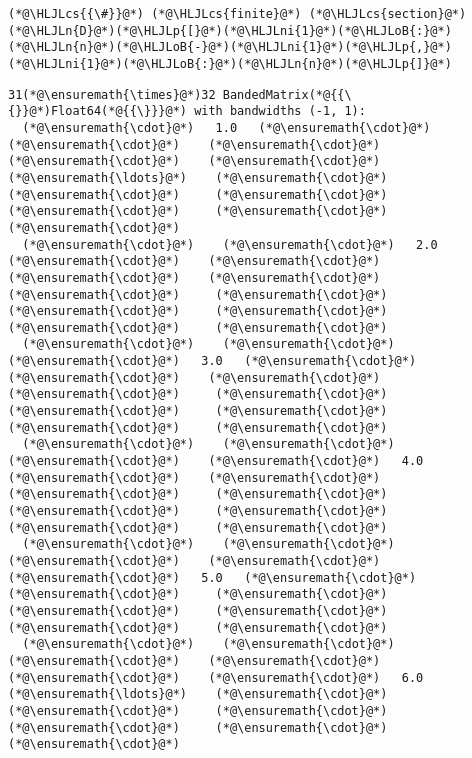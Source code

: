 \documentclass[12pt,a4paper]{article}
\newcommand{\HLJLn}[1]{#1}
\newcommand{\HLJLni}[1]{\textcolor[RGB]{59,151,46}{#1}}
\newcommand{\HLJLoB}[1]{\textcolor[RGB]{102,102,102}{\textbf{#1}}}
\newcommand{\HLJLp}[1]{#1}
\newcommand{\HLJLcs}[1]{\textcolor[RGB]{153,153,119}{\textit{#1}}}
\begin{document}
\begin{lstlisting}
(*@\HLJLcs{{\#}}@*) (*@\HLJLcs{finite}@*) (*@\HLJLcs{section}@*)
(*@\HLJLn{D}@*)(*@\HLJLp{[}@*)(*@\HLJLni{1}@*)(*@\HLJLoB{:}@*)(*@\HLJLn{n}@*)(*@\HLJLoB{-}@*)(*@\HLJLni{1}@*)(*@\HLJLp{,}@*)(*@\HLJLni{1}@*)(*@\HLJLoB{:}@*)(*@\HLJLn{n}@*)(*@\HLJLp{]}@*)
\end{lstlisting}

\begin{lstlisting}
31(*@\ensuremath{\times}@*)32 BandedMatrix(*@{{\{}}@*)Float64(*@{{\}}}@*) with bandwidths (-1, 1):
  (*@\ensuremath{\cdot}@*)   1.0   (*@\ensuremath{\cdot}@*)    (*@\ensuremath{\cdot}@*)    (*@\ensuremath{\cdot}@*)    (*@\ensuremath{\cdot}@*)    (*@\ensuremath{\cdot}@*)   (*@\ensuremath{\ldots}@*)    (*@\ensuremath{\cdot}@*)     (*@\ensuremath{\cdot}@*)     (*@\ensuremath{\cdot}@*)     (*@\ensuremath{\cdot}@*)     (*@\ensuremath{\cdot}@*)     (*@\ensuremath{\cdot}@*) 
  (*@\ensuremath{\cdot}@*)    (*@\ensuremath{\cdot}@*)   2.0   (*@\ensuremath{\cdot}@*)    (*@\ensuremath{\cdot}@*)    (*@\ensuremath{\cdot}@*)    (*@\ensuremath{\cdot}@*)        (*@\ensuremath{\cdot}@*)     (*@\ensuremath{\cdot}@*)     (*@\ensuremath{\cdot}@*)     (*@\ensuremath{\cdot}@*)     (*@\ensuremath{\cdot}@*)     (*@\ensuremath{\cdot}@*) 
  (*@\ensuremath{\cdot}@*)    (*@\ensuremath{\cdot}@*)    (*@\ensuremath{\cdot}@*)   3.0   (*@\ensuremath{\cdot}@*)    (*@\ensuremath{\cdot}@*)    (*@\ensuremath{\cdot}@*)        (*@\ensuremath{\cdot}@*)     (*@\ensuremath{\cdot}@*)     (*@\ensuremath{\cdot}@*)     (*@\ensuremath{\cdot}@*)     (*@\ensuremath{\cdot}@*)     (*@\ensuremath{\cdot}@*) 
  (*@\ensuremath{\cdot}@*)    (*@\ensuremath{\cdot}@*)    (*@\ensuremath{\cdot}@*)    (*@\ensuremath{\cdot}@*)   4.0   (*@\ensuremath{\cdot}@*)    (*@\ensuremath{\cdot}@*)        (*@\ensuremath{\cdot}@*)     (*@\ensuremath{\cdot}@*)     (*@\ensuremath{\cdot}@*)     (*@\ensuremath{\cdot}@*)     (*@\ensuremath{\cdot}@*)     (*@\ensuremath{\cdot}@*) 
  (*@\ensuremath{\cdot}@*)    (*@\ensuremath{\cdot}@*)    (*@\ensuremath{\cdot}@*)    (*@\ensuremath{\cdot}@*)    (*@\ensuremath{\cdot}@*)   5.0   (*@\ensuremath{\cdot}@*)        (*@\ensuremath{\cdot}@*)     (*@\ensuremath{\cdot}@*)     (*@\ensuremath{\cdot}@*)     (*@\ensuremath{\cdot}@*)     (*@\ensuremath{\cdot}@*)     (*@\ensuremath{\cdot}@*) 
  (*@\ensuremath{\cdot}@*)    (*@\ensuremath{\cdot}@*)    (*@\ensuremath{\cdot}@*)    (*@\ensuremath{\cdot}@*)    (*@\ensuremath{\cdot}@*)    (*@\ensuremath{\cdot}@*)   6.0  (*@\ensuremath{\ldots}@*)    (*@\ensuremath{\cdot}@*)     (*@\ensuremath{\cdot}@*)     (*@\ensuremath{\cdot}@*)     (*@\ensuremath{\cdot}@*)     (*@\ensuremath{\cdot}@*)     (*@\ensuremath{\cdot}@*) 

\end{lstlisting}
\end{document}
